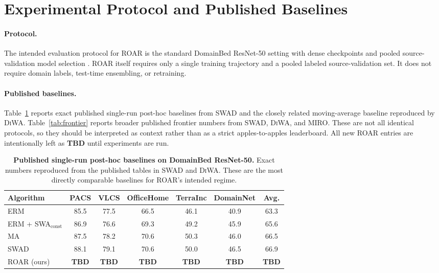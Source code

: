 \documentclass{article}
\newcommand{\TBD}{\textbf{TBD}}
\newcommand{\roar}{\textup{\textsc{ROAR}}}
\newcommand{\swad}{\textup{\textsc{SWAD}}}
\newcommand{\diwa}{\textup{\textsc{DiWA}}}
\newcommand{\miro}{\textup{\textsc{MIRO}}}
\begin{document}
\section{Experimental Protocol and Published Baselines}
\label{sec:experiments}

\paragraph{Protocol.}
The intended evaluation protocol for \roar{} is the standard DomainBed ResNet-50 setting with dense checkpoints and pooled source-validation model selection \citep{gulrajani2021domainbed,cha2021swad}. \roar{} itself requires only a single training trajectory and a pooled labeled source-validation set. It does not require domain labels, test-time ensembling, or retraining.

\paragraph{Published baselines.}
Table~\ref{tab:single_run} reports exact published single-run post-hoc baselines from \swad{} and the closely related moving-average baseline reproduced by \diwa{}. Table~\ref{tab:frontier} reports broader published frontier numbers from \swad{}, \diwa{}, and \miro{}. These are not all identical protocols, so they should be interpreted as context rather than as a strict apples-to-apples leaderboard. All new \roar{} entries are intentionally left as \TBD{} until experiments are run.

\begin{table}[t]
    \centering
    \small
    \caption{\textbf{Published single-run post-hoc baselines on DomainBed ResNet-50.} Exact numbers reproduced from the published tables in \swad{} and \diwa{}. These are the most directly comparable baselines for \roar{}'s intended regime.}
    \label{tab:single_run}
    \begin{tabular}{lccccc|c}
        \toprule
        Algorithm & PACS & VLCS & OfficeHome & TerraInc & DomainNet & Avg. \\
        \midrule
        ERM \citep{cha2021swad} & 85.5 & 77.5 & 66.5 & 46.1 & 40.9 & 63.3 \\
        ERM + SWA$_{\text{const}}$ \citep{cha2021swad} & 86.9 & 76.6 & 69.3 & 49.2 & 45.9 & 65.6 \\
        MA \citep{rame2022diwa} & 87.5 & 78.2 & 70.6 & 50.3 & 46.0 & 66.5 \\
        \swad{} \citep{cha2021swad} & 88.1 & 79.1 & 70.6 & 50.0 & 46.5 & 66.9 \\
        \roar{} (ours) & \TBD{} & \TBD{} & \TBD{} & \TBD{} & \TBD{} & \TBD{} \\
        \bottomrule
    \end{tabular}
\end{table}
\end{document}
